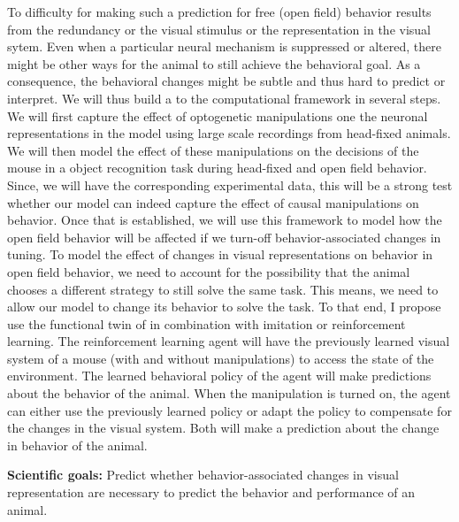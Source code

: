 \documentclass[B2,COG]{ercgrant}
\begin{document}
To difficulty for making such a prediction for free (open field) behavior results from the redundancy or the visual stimulus or the representation in the visual sytem. 
Even when a particular neural mechanism is suppressed or altered, there might be other ways for the animal to still achieve the behavioral goal. 
As a consequence, the behavioral changes might be subtle and thus hard to predict or interpret.
We will thus build a to the computational framework in several steps. 
We will first capture the effect of optogenetic manipulations one the neuronal representations in the model using large scale recordings from head-fixed animals. 
We will then model the effect of these manipulations on the decisions of the mouse in a object recognition task during head-fixed and open field behavior. 
Since, we will have the corresponding experimental data, this will be a strong test whether our model can indeed capture the effect of causal manipulations on behavior.
Once that is established, we will use this framework to model how the open field behavior will be affected if we turn-off behavior-associated changes in tuning.
To model the effect of changes in visual representations on behavior in open field behavior, we need to account for the possibility that the animal chooses a different strategy to still solve the same task. 
This means, we need to allow our model to change its behavior to solve the task. 
To that end, I propose use the functional twin of in combination with imitation or reinforcement learning.
The reinforcement learning agent will have the previously learned visual system of a mouse (with and without manipulations) to access the state of the environment.
The learned behavioral policy of the agent will make predictions about the behavior of the animal. 
When the manipulation is turned on, the agent can either use the previously learned policy or adapt the policy to compensate for the changes in the visual system.
Both will make a prediction about the change in behavior of the animal. 

\textbf{Scientific goals:}  Predict whether behavior-associated changes in visual representation 
are necessary to predict the behavior and performance of an animal. 
\end{document}
